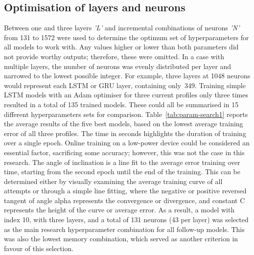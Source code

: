 \subsection{Optimisation of layers and neurons}
%
Between one and three layers \textit{'L'} and incremental combinations of neurons \textit{'N'} from 131 to 1572 were used to determine the optimum set of hyperparameters for all models to work with.
Any values higher or lower than both parameters did not provide worthy outputs; therefore, these were omitted.
In a case with multiple layers, the number of neurons was evenly distributed per layer and narrowed to the lowest possible integer.
For example, three layers at 1048 neurons would represent each LSTM or GRU layer, containing only~349.
Training simple LSTM models with an Adam optimiser for three current profiles only three times  resulted in a total of 135 trained models.
These could all be summarised in 15 different hyperparameters sets for comparison.
\mbox{Table~\ref{tab:param-search1}} reports the average results of the five best models, based on the lowest average training error of all three profiles.
The time in seconds highlights the duration of training over a single epoch.
Online training on a low-power device could be considered an essential factor, sacrificing some accuracy; however, this was not the case in this research.
The angle of inclination is a line fit to the average error training over time, starting from the second epoch until the end of the training.
This can be determined either by visually examining the average training curve of all attempts or through a simple line fitting, where the negative or positive reversed tangent of angle alpha represents the convergence or divergence, and constant C represents the height of the curve or average error.
%
As a result, a model with index 10, with three layers, and a total of 131 neurons (43 per layer) was selected as the main research hyperparameter combination for all follow-up models.
This was also the lowest memory combination, which served as another criterion in favour of this selection.
